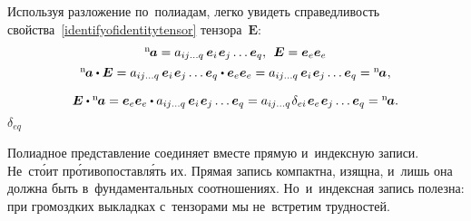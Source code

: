 \begin{otherlanguage}{russian}
Используя разложение по~полиадам, легко увидеть справедливость свойства~\eqref{identifyofidentitytensor}  тензора~$\bm{E}$:
\vspace{0.1em}\[\begin{array}{c}
{^\mathrm{n}\hspace{-0.2ex}\bm{a}} = a_{ij \ldots q} \hspace{0.4ex} \bm{e}_i \hspace{0.2ex} \bm{e}_j \ldots \bm{e}_q , \;\,  \bm{E} = \bm{e}_e \bm{e}_e \\[0.4em]
{^\mathrm{n}\hspace{-0.2ex}\bm{a}} \dotp \bm{E} = a_{ij \ldots q} \hspace{0.4ex} \bm{e}_i \hspace{0.2ex} \bm{e}_j \ldots \tikzmark{BeginDeltaEQBrace} {\bm{e}_q \dotp \bm{e}_e} \tikzmark{EndDeltaEQBrace} \bm{e}_e = a_{ij \ldots q} \hspace{0.4ex} \bm{e}_i \hspace{0.2ex} \bm{e}_j \ldots \bm{e}_q = {^\mathrm{n}\hspace{-0.2ex}\bm{a}} \hspace{0.1ex}, \\[1em]
\bm{E} \dotp {^\mathrm{n}\hspace{-0.2ex}\bm{a}} = \bm{e}_e \bm{e}_e \dotp a_{ij \ldots q} \hspace{0.4ex} \bm{e}_i \hspace{0.2ex} \bm{e}_j \ldots \bm{e}_q = a_{ij \ldots q} \hspace{0.2ex} \delta_{ei} \hspace{0.2ex} \bm{e}_e \hspace{0.2ex} \bm{e}_j \ldots \bm{e}_q = {^\mathrm{n}\hspace{-0.2ex}\bm{a}}.
\end{array}\]
%
{${\scriptstyle \delta_{eq}}$}

\vspace{-0.5em} Полиадное представление соединяет вместе прямую и~индексную записи. Не~ст\'{о}ит пр\'{о}тиво\-постав\-л\'{я}ть их. Прямая запись компактна, изящна, и~лишь она должна быть в~фундаментальных соотношениях. Но~и~индексная запись полезна: при громоздких выкладках с~тензорами мы не~встретим трудностей.

\end{otherlanguage}


